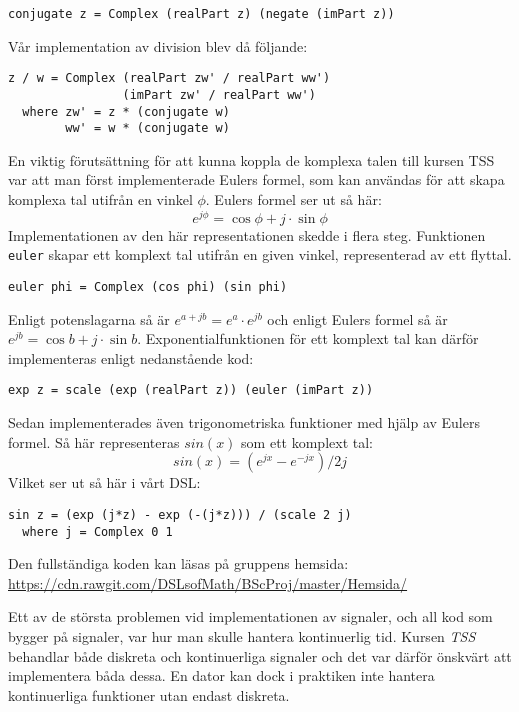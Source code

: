 \documentclass[]{article}
\begin{document}
\begin{verbatim}
conjugate z = Complex (realPart z) (negate (imPart z))
\end{verbatim}
Vår implementation av division blev då följande:
\begin{verbatim}
z / w = Complex (realPart zw' / realPart ww')
                (imPart zw' / realPart ww')
  where zw' = z * (conjugate w)
        ww' = w * (conjugate w)
\end{verbatim}

En viktig förutsättning för att kunna koppla de komplexa talen till kursen TSS var att man först
implementerade Eulers formel, som kan användas för att skapa komplexa tal utifrån en vinkel $\phi$. Eulers
formel ser ut så här:
\[e^{j\phi}=\cos \phi+ j \cdot \sin \phi \]
Implementationen av den här representationen skedde i flera steg.
Funktionen \texttt{euler} skapar ett komplext tal utifrån en
given vinkel, representerad av ett flyttal.
\begin{verbatim}
euler phi = Complex (cos phi) (sin phi)
\end{verbatim}
Enligt potenslagarna%
så är \(e^{a+jb} = e^{a} \cdot e^{jb}\) och enligt Eulers formel så är
\(e^{j b} = \cos b + j\cdot \sin b\).
%
Exponentialfunktionen för ett komplext tal kan därför implementeras
enligt nedanstående kod:

\begin{verbatim}
exp z = scale (exp (realPart z)) (euler (imPart z))
\end{verbatim}
Sedan implementerades även trigonometriska funktioner med hjälp av Eulers
formel. Så här representeras $sin(x)$ som ett komplext tal:
\[ sin(x) = (e^{j x} - e^{-j x}) / 2 j \]
Vilket ser ut så här i vårt DSL:
\begin{verbatim}
sin z = (exp (j*z) - exp (-(j*z))) / (scale 2 j)
  where j = Complex 0 1
\end{verbatim}

Den fullständiga koden kan läsas på gruppens hemsida:
\url{https://cdn.rawgit.com/DSLsofMath/BScProj/master/Hemsida/}

Ett av de största problemen vid implementationen av signaler, och all kod som bygger på signaler, var hur man
skulle hantera kontinuerlig tid. Kursen \textit{TSS} behandlar både diskreta och kontinuerliga signaler och det var
därför önskvärt att implementera båda dessa. En dator kan dock i praktiken inte hantera kontinuerliga funktioner utan
endast diskreta.
\end{document}
